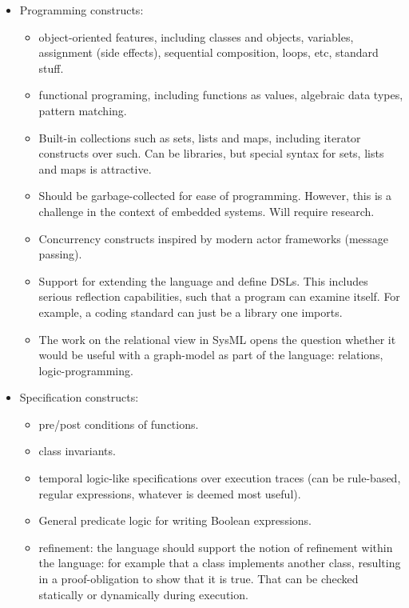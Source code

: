 \documentclass{llncs}
\begin{document}
\begin{itemize}
  \item Programming constructs:
    \begin{itemize}
      \item object-oriented features, including classes and objects, variables, 
        assignment (side effects), sequential composition, loops, etc, standard stuff.
      \item functional programing, including functions as values, algebraic data 
        types, pattern matching.
      \item Built-in collections such as sets, lists and maps, including iterator constructs over such. 
        Can be libraries, but special syntax for sets, lists and maps is attractive.
      \item Should be garbage-collected for ease of programming. However,
        this is a challenge in the context of embedded systems. Will require
        research.
      \item Concurrency constructs inspired by modern actor frameworks (message passing).
      \item Support for extending the language and define DSLs. This includes serious reflection capabilities, such
      that a program can examine itself. For example, a coding standard can just be a library one imports.
      \item The work on the relational view in SysML opens the question whether it would be
      useful with a graph-model as part of the language: relations, logic-programming.
    \end{itemize}
 
  \item Specification constructs:
    \begin{itemize}
      \item pre/post conditions of functions.
      \item class invariants.
      \item temporal logic-like specifications over execution traces 
         (can be rule-based, regular expressions, whatever is deemed 
         most useful). 
      \item General predicate logic for writing Boolean expressions. 
      \item refinement: the language should support the notion of refinement 
        within the language: for example that a class 
        implements another class, resulting in a proof-obligation to show that it is true. That can be checked
        statically or dynamically during execution.
    \end{itemize}
\end{itemize}
\end{document}
